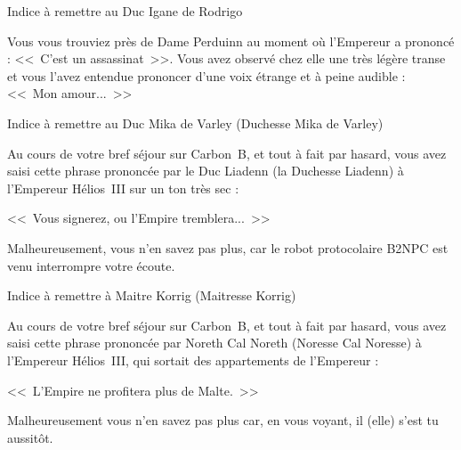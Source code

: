 \documentclass{article}
\begin{document}
\begin{samepage}
    Indice à remettre au Duc Igane de Rodrigo

    \nobreak

    \begin{framed}
        Vous vous trouviez près de Dame Perduinn au moment où l'Empereur a
        prononcé : <<~C'est un assassinat~>>. Vous avez observé chez elle une
        très légère transe et vous l'avez entendue prononcer d'une voix étrange
        et à peine audible : <<~Mon amour...~>>
    \end{framed}
\end{samepage}

\begin{samepage}
    Indice à remettre au Duc Mika de Varley (Duchesse Mika de Varley)

    \nobreak

    \begin{framed}
        Au cours de votre bref séjour sur Carbon~B, et tout à fait par hasard,
        vous avez saisi cette phrase prononcée par le Duc Liadenn (la Duchesse
        Liadenn) à l'Empereur Hélios~III sur un ton très sec :

        \nobreak

        <<~Vous signerez, ou l'Empire tremblera...~>>

        \nobreak

        Malheureusement, vous n'en savez pas plus, car le robot protocolaire
        B2NPC est venu interrompre votre écoute.
    \end{framed}
\end{samepage}

\begin{samepage}
    Indice à remettre à Maitre Korrig (Maitresse Korrig)

    \nobreak

    \begin{framed}
        Au cours de votre bref séjour sur Carbon~B, et tout à fait par hasard,
        vous avez saisi cette phrase prononcée par Noreth Cal Noreth (Noresse
        Cal Noresse) à l'Empereur Hélios~III, qui sortait des appartements de
        l'Empereur :

        \nobreak

        <<~L'Empire ne profitera plus de Malte.~>>

        \nobreak

        Malheureusement vous n'en savez pas plus car, en vous voyant, il (elle)
        s'est tu aussitôt.
    \end{framed}
\end{samepage}
\end{document}
